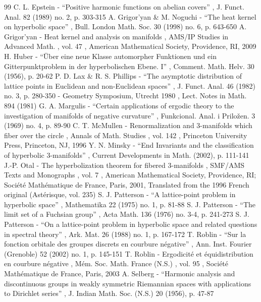 \begin{thebibliography}{99}
 C. L. Epstein - “Positive harmonic functions on abelian covers” , J. Funct. Anal. 82 (1989) no. 2, p. 303-315
 A. Grigor’yan \& M. Noguchi - “The heat kernel on hyperbolic space” , Bull. London Math. Soc. 30 (1998) no. 6, p. 643-650
 A. Grigor’yan - Heat kernel and analysis on manifolds , AMS/IP Studies in Advanced Math. , vol. 47 , American Mathematical Society, Providence, RI, 2009
 H. Huber - “Über eine neue Klasse automorpher Funktionen und ein Gitterpunktproblem in der hyperbolischen Ebene. I” , Comment. Math. Helv. 30 (1956), p. 20-62
 P. D. Lax \& R. S. Phillips - “The asymptotic distribution of lattice points in Euclidean and non-Euclidean spaces” , J. Funct. Anal. 46 (1982) no. 3, p. 280-350
 - Geometry Symposium, Utrecht 1980 , Lect. Notes in Math. 894 (1981)
 G. A. Margulis - “Certain applications of ergodic theory to the investigation of manifolds of negative curvature” , Funkcional. Anal. i Priložen. 3 (1969) no. 4, p. 89-90
 C. T. McMullen - Renormalization and 3-manifolds which fiber over the circle , Annals of Math. Studies , vol. 142 , Princeton University Press, Princeton, NJ, 1996
 Y. N. Minsky - “End Invariants and the classification of hyperbolic 3-manifolds” , Current Developments in Math. (2002), p. 111-141
 J.-P. Otal - The hyperbolization theorem for fibered 3-manifolds , SMF/AMS Texts and Monographs , vol. 7 , American Mathematical Society, Providence, RI; Société Mathématique de France, Paris, 2001, Translated from the 1996 French original (Astérisque, vol. 235)
 S. J. Patterson - “A lattice-point problem in hyperbolic space” , Mathematika 22 (1975) no. 1, p. 81-88
 S. J. Patterson - “The limit set of a Fuchsian group” , Acta Math. 136 (1976) no. 3-4, p. 241-273
 S. J. Patterson - “On a lattice-point problem in hyperbolic space and related questions in spectral theory” , Ark. Mat. 26 (1988) no. 1, p. 167-172
 T. Roblin - “Sur la fonction orbitale des groupes discrets en courbure négative” , Ann. Inst. Fourier (Grenoble) 52 (2002) no. 1, p. 145-151
 T. Roblin - Ergodicité et équidistribution en courbure négative , Mém. Soc. Math. France (N.S.) , vol. 95 , Société Mathématique de France, Paris, 2003
 A. Selberg - “Harmonic analysis and discontinuous groups in weakly symmetric Riemannian spaces with applications to Dirichlet series” , J. Indian Math. Soc. (N.S.) 20 (1956), p. 47-87

\end{thebibliography}
